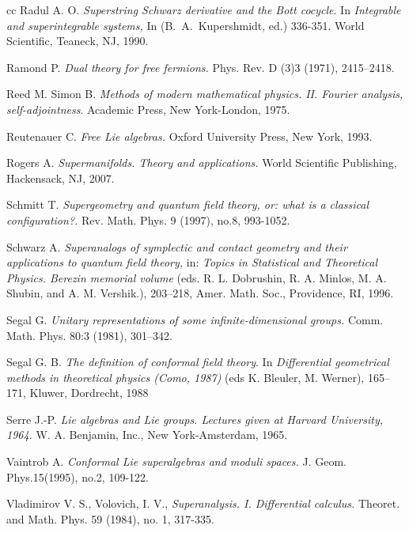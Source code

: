 \documentclass[]{amsart}
\begin{document}
\begin{thebibliography}{cc}
Radul A. O.
{\it Superstring Schwarz derivative and the Bott cocycle}.
  In {\it Integrable and superintegrable systems,} In (B.~A.~Kupershmidt, ed.) 336-351.
World Scientific, Teaneck, NJ, 1990.

Ramond P.
{\it Dual theory for free fermions.} Phys. Rev. D (3)3 (1971), 2415–2418.

Reed M. Simon B.
{\it Methods of modern mathematical physics. II. Fourier analysis, self-adjointness}.
Academic Press, New York-London, 1975. 


Reutenauer C.
{\it Free Lie algebras.}
 Oxford University Press, New York, 1993.

Rogers A.
{\it Supermanifolds.
Theory and applications.}
World Scientific Publishing, Hackensack, NJ, 2007.
 
 
Schmitt T.
{\it Supergeometry and quantum field theory, or: what is a classical configuration?.}  Rev. Math. Phys. 9 (1997), no.8, 993-1052.

Schwarz A.  {\it Superanalogs of symplectic and contact geometry and their applications to quantum field theory,}
 in: {\it Topics in Statistical and Theoretical
Physics. Berezin memorial volume} (eds. R. L. Dobrushin, R. A. Minlos, M. A. Shubin, and A. M. Vershik.),  203–218,  Amer. Math. Soc., Providence, RI, 1996.

  


  Segal G. {\it Unitary representations of some infinite-dimensional groups.} Comm. Math. Phys. 80:3 (1981),  301--342.

Segal G. B.
{\it The definition of conformal field theory}. In {\it Differential geometrical methods in theoretical physics (Como, 1987)} (eds K. Bleuler, M. Werner), 165–171,
Kluwer, Dordrecht, 1988

Serre J.-P.
{\it Lie algebras and Lie groups.
Lectures given at Harvard University, 1964.}
W. A. Benjamin, Inc., New York-Amsterdam, 1965. 
 

 
 
Vaintrob A.
{\it Conformal Lie superalgebras and moduli spaces.}
J. Geom. Phys.15(1995), no.2, 109-122.

Vladimirov V. S., Volovich, I. V.,
{\it Superanalysis. I. Differential calculus.}
Theoret. and Math. Phys. 59 (1984), no. 1, 317-335.



\end{thebibliography}
\end{document}

